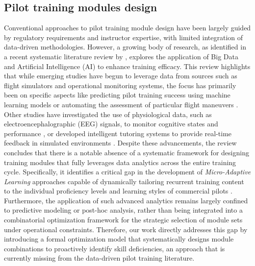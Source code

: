 \documentclass[opre,sglanonrev]{informs4}
\begin{document}
\subsection{Pilot training modules design}
Conventional approaches to pilot training module design have been largely guided by regulatory requirements and instructor expertise, with limited integration of data-driven methodologies. However, a growing body of research, as identified in a recent systematic literature review by \citet{Shaker2023CyMaEn}, explores the application of Big Data and Artificial Intelligence (AI) to enhance training efficacy. This review highlights that while emerging studies have begun to leverage data from sources such as flight simulators and operational monitoring systems, the focus has primarily been on specific aspects like predicting pilot training success using machine learning models \citep{Jenkins2022} or automating the assessment of particular flight maneuvers \citep{Guevarra2022}. Other studies have investigated the use of physiological data, such as electroencephalographic (EEG) signals, to monitor cognitive states and performance \citep{Binias2018}, or developed intelligent tutoring systems to provide real-time feedback in simulated environments \citep{Yang2021}. Despite these advancements, the review concludes that there is a notable absence of a systematic framework for designing training modules that fully leverages data analytics across the entire training cycle. Specifically, it identifies a critical gap in the development of \emph{Micro-Adaptive Learning} approaches capable of dynamically tailoring recurrent training content to the individual proficiency levels and learning styles of commercial pilots \citep{Shaker2023CyMaEn}. Furthermore, the application of such advanced analytics remains largely confined to predictive modeling or post-hoc analysis, rather than being integrated into a combinatorial optimization framework for the strategic selection of module sets under operational constraints. Therefore, our work directly addresses this gap by introducing a formal optimization model that systematically designs module combinations to proactively identify skill deficiencies, an approach that is currently missing from the data-driven pilot training literature.
\end{document}
